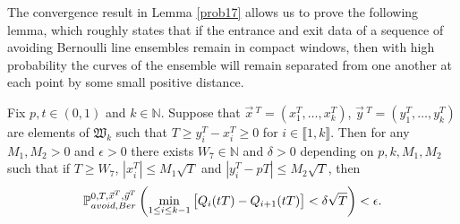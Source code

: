The convergence result in Lemma \ref{prob17} allows us to prove the following lemma, which roughly states that if the entrance and exit data of a sequence of avoiding Bernoulli line ensembles remain in compact windows, then with high probability the curves of the ensemble will remain separated from one another at each point by some small positive distance.

\begin{lemma}\label{prob 20}
Fix $p,t\in (0,1)$ and $ k\in \mathbb{N}$. Suppose that $\vec x\,^T=(x_1^T,\dots, x_k^T)$, $\vec y\,^T=(y_1^T,\dots , y_k^T)$ are elements of $\mathfrak{W}_k$ such that $T\geq y_i^T-x_i^T\geq 0$ for $i\in \llbracket 1,k\rrbracket$. Then for any $M_1,M_2>0$ and $\epsilon>0$ there exists $W_7\in\mathbb{N}$ and $\delta>0$ depending on $p,k,M_1,M_2$ such that if $T\geq W_7$, $|x_i^T|\leq M_1\sqrt{T}$ and $|y_i^T-pT|\leq M_2\sqrt{T}$, then 
\[
\mathbb{P}^{0,T,\vec x^T, \vec y^T}_{avoid,Ber}\left(\min_{1\leq i\leq k-1} \big[Q_i(tT)-Q_{i+1}(tT)\big]<\delta\sqrt{T}\right)<\epsilon.
\]
\end{lemma}
